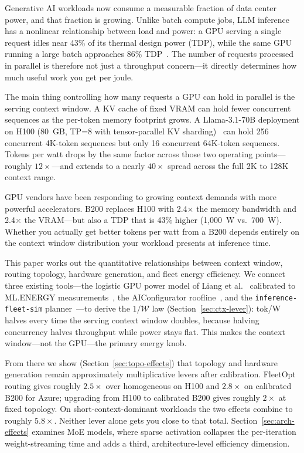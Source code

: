 \documentclass[11pt,a4paper]{article}
\begin{document}
Generative AI workloads now consume a measurable fraction of data center
power, and that fraction is growing.  Unlike batch compute jobs, LLM inference
has a nonlinear relationship between load and power: a GPU serving a single
request idles near 43\% of its thermal design power (TDP), while the same GPU
running a large batch approaches 86\% TDP~\citep{chung2026mlenergy}.  The
number of requests processed in parallel is therefore not just a throughput
concern---it directly determines how much useful work you get per joule.

The main thing controlling how many requests a GPU can hold in parallel is the
serving context window.  A KV cache of fixed VRAM can hold fewer concurrent
sequences as the per-token memory footprint grows.  A Llama-3.1-70B deployment
on H100 (80~GB, TP=8 with tensor-parallel KV sharding)~\citep{meta2024llama3}
can hold 256 concurrent 4K-token sequences but only 16 concurrent
64K-token sequences.  Tokens per
watt drops by the same factor across those two operating points---roughly
$12\times$---and extends to a nearly $40\times$ spread across the full
2K to 128K context range.

GPU vendors have been responding to growing context demands with more
powerful accelerators.  B200 replaces H100 with 2.4$\times$ the memory bandwidth and 2.4$\times$
the VRAM---but also a TDP that is 43\% higher (1{,}000~W vs.\ 700~W).  Whether you actually get better tokens per watt
from a B200 depends entirely on the context window distribution your workload
presents at inference time.

This paper works out the quantitative relationships between context window,
routing topology, hardware generation, and fleet energy efficiency.  We connect three existing tools---the logistic GPU power model of Liang et
al.~\citep{liang2026g2g} calibrated to ML.ENERGY measurements~\citep{chung2026mlenergy},
the AIConfigurator roofline~\citep{xu2026aiconfigurator},
and the \texttt{inference-fleet-sim} planner~\citep{chen2026fleetsim}---to derive
the $1/\mathcal{W}$ law (Section~\ref{sec:ctx-lever}): tok/W halves every time
the serving context window doubles, because halving concurrency halves throughput
while power stays flat.  This makes the context window---not the GPU---the
primary energy knob.

From there we show (Section~\ref{sec:topo-effects}) that topology and hardware
generation remain approximately multiplicative levers after calibration.
FleetOpt routing gives roughly $2.5\times$ over homogeneous on H100 and
$2.8\times$ on calibrated B200 for Azure; upgrading from H100 to calibrated
B200 gives roughly $2\times$ at fixed topology.  On short-context-dominant
workloads the two effects combine to roughly $5.8\times$.  Neither lever alone
gets you close to that total.
Section~\ref{sec:arch-effects} examines MoE models, where sparse activation
collapses the per-iteration weight-streaming time and adds a third, architecture-level
efficiency dimension.
\end{document}
